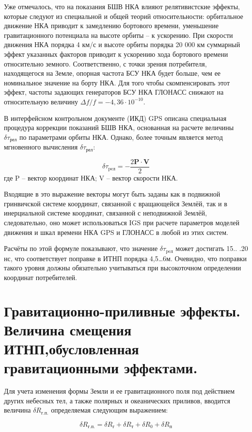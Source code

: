 \documentclass[14pt,a4paper,oneside]{extarticle}
\begin{document}
Уже отмечалось, что на показания БШВ НКА влияют релятивистские эффекты, которые следуют из специальной и общей теорий относительности: орбитальное движение НКА приводит к замедлению бортового времени, уменьшение гравитационного потенциала на высоте орбиты – к ускорению. При скорости движения НКА порядка 4 км/с и высоте орбиты порядка 20 000 км суммарный эффект указанных факторов приводит к ускорению хода бортового времени относительно земного. Соответственно, с точки зрения потребителя, находящегося на Земле, опорная частота БСУ НКА будет больше, чем ее номинальное значение на борту НКА. Для того чтобы скомпенсировать этот эффект, частоты задающих генераторов БСУ НКА ГЛОНАСС снижают на относительную величину $\Delta f/f=-4,36\cdot10^{-10}$.

В интерфейсном контрольном документе (ИКД) GPS описана специальная процедура коррекции показаний БШВ НКА, основанная на расчете величины $\delta \tau_\text{рел}$ по параметрами орбиты НКА. Однако, более точным является метод мгновенного вычисления $\delta \tau_\text{рел}$:

\[\delta\tau_{\text{pe}\text{л}} = - \frac { 2 \boldsymbol{P}\cdot\boldsymbol{V}}{2}\] где P – вектор координат НКА; V – вектор скорости НКА.

Входящие в это выражение векторы могут быть заданы как в подвижной гринвичской системе координат, связанной с вращающейся Землёй, так и в инерциальной системе координат, связанной с неподвижной Землёй, следовательно, оно может использоваться IGS при расчете параметров моделей движения и шкал времени НКА GPS и ГЛОНАСС в любой из этих систем.

Расчёты по этой формуле показывают, что значение $\delta\tau_{\text{pe}\text{л}}$ может достигать 15.. .20 нс, что соответствует поправке в ИТНП порядка 4,5…6м. Очевидно, что поправки такого уровня должны обязательно учитываться при высокоточном определении координат потребителей.

\section{Гравитационно-приливные эффекты. Величина смещения ИТНП,обусловленная гравитационными эффектами.}

Для учета изменения формы Земли и ее гравитационного поля под действием других небесных тел, а также полярных и океанических приливов, вводится величина $\delta R_\text{г.п.}$ определяемая следующим выражением:

\[\delta R_\text{г.п.}=\delta R_\text{г}+\delta R_\text{т}+\delta R_\text{0}+\delta R_\text{п}\]
\end{document}
